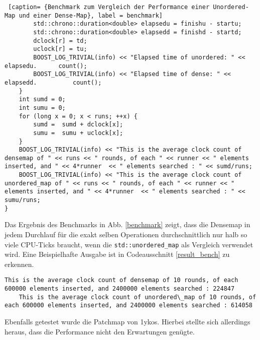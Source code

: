 \documentclass[../review_3.tex]{subfiles}
\begin{document}
\begin{lstlisting} [caption= {Benchmark zum Vergleich der Performance einer Unordered-Map und einer Dense-Map}, label = benchmark]
        std::chrono::duration<double> elapsedu = finishu - startu;
        std::chrono::duration<double> elapsedd = finishd - startd; 
        dclock[r] = td; 
        uclock[r] = tu; 
        BOOST_LOG_TRIVIAL(info) << "Elapsed time of unordered: " << elapsedu.      count();
        BOOST_LOG_TRIVIAL(info) << "Elapsed time of dense: " << elapsedd.          count();
    }
    int sumd = 0; 
    int sumu = 0; 
    for (long x = 0; x < runs; ++x) {
        sumd =  sumd + dclock[x]; 
        sumu =  sumu + uclock[x];
    }
    BOOST_LOG_TRIVIAL(info) << "This is the average clock count of densemap of " << runs << " rounds, of each " << runner << " elements inserted, and " << 4*runner  << " elements searched : " << sumd/runs;
    BOOST_LOG_TRIVIAL(info) << "This is the average clock count of unordered_map of " << runs << " rounds, of each " << runner << " elements inserted, and " << 4*runner  << " elements searched : " << sumu/runs;
} \end{lstlisting}
Das Ergebnis des Benchmarks in Abb. \ref{benchmark} zeigt, dass die Densemap in jedem Durchlauf für die exakt selben Operationen durchschnittlich nur halb so viele CPU-Ticks braucht, wenn die \texttt{std::unordered\_map} als Vergleich verwendet wird. Eine Beispielhafte Ausgabe ist in Codeausschnitt \ref{result_bench} zu erkennen.

\begin{lstlisting}[caption= {Beispielhaftes Ergebnis des Benchmarks zum Vergleich der Performance einer Unordered-Map und einer Dense-Map}, label = result_bench]
	This is the average clock count of densemap of 10 rounds, of each 600000 elements inserted, and 2400000 elements searched : 224847
	This is the average clock count of unordered\_map of 10 rounds, of each 600000 elements inserted, and 2400000 elements searched : 614058
\end{lstlisting}

Ebenfalls getestet wurde die Patchmap von 1ykos. Hierbei stellte sich allerdings heraus, dass die Performance nicht den Erwartungen genügte.
\end{document}
